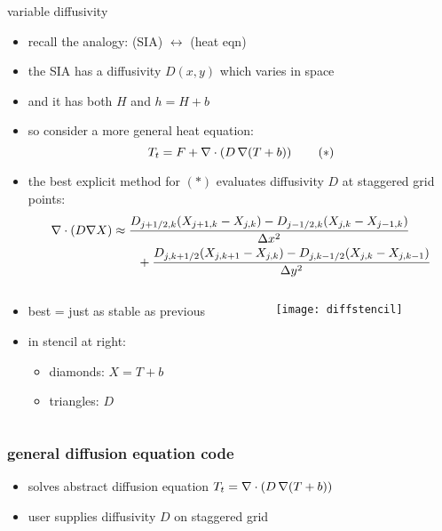 \begin{frame}{variable diffusivity}

\begin{itemize}
  \item recall the analogy: \qquad (SIA) $\leftrightarrow$ (heat eqn)
  \item the SIA has a diffusivity $D(x,y)$ which varies in space
  \item and it has both $H$ and $h=H+b$
  \item so consider a more general heat equation:
\begin{equation}
T_t = F + \nabla\cdot \left(D\, \nabla (T+b)\right) \tag{$\ast$}
\end{equation}
  \item the best explicit method for $(\ast)$ evaluates diffusivity $D$ at \alert{staggered} grid points:
  \scriptsize
\begin{align*}
\nabla\cdot \left(D \nabla X\right) &\approx \frac{D_{j+1/2,k}(X_{j+1,k} - X_{j,k}) - D_{j-1/2,k}(X_{j,k} - X_{j-1,k})}{\Delta x^2} \\
	&\qquad + \frac{D_{j,k+1/2}(X_{j,k+1} - X_{j,k}) - D_{j,k-1/2}(X_{j,k} - X_{j,k-1})}{\Delta y^2}
\end{align*}
\end{itemize}

\vspace{-0.15in}
\small
\begin{columns}
\begin{column}{0.55\textwidth}
\begin{itemize}
\item best = just as stable as previous
\item in stencil at right:
  \begin{itemize}
  \item[] diamonds: $X = T+b$
  \item[] triangles: $D$
  \end{itemize}
\end{itemize}
\end{column}
\begin{column}{0.45\textwidth}
\begin{center}
\texttt{[image: diffstencil]}
\end{center}
\end{column}
\end{columns}
\end{frame}


\begin{frame}
  \frametitle{general diffusion equation code}


\small
\begin{itemize}
\item solves abstract diffusion equation $T_t = \nabla\cdot \left(D \, \nabla (T + b)\right)$
\item user supplies diffusivity $D$ on staggered grid
\end{itemize}
\end{frame}


